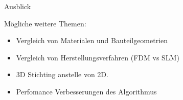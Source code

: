 \documentclass[../slides.tex]{subfiles}
\begin{document}
  \begin{frame}{Ausblick}
    \begin{minipage}[h]{.6\textwidth}
        \begin{block}{Mögliche weitere Themen:}
            \begin{itemize}
                \item Vergleich von Materialen und Bauteilgeometrien
                \item Vergleich von Herstellungsverfahren (FDM vs SLM)
                \item 3D Stichting anstelle von 2D.
                \item Perfomance Verbesserungen des Algorithmus
            \end{itemize}
        \end{block}
    \end{minipage}
    \hfill
    \begin{minipage}[h]{.39\textwidth}       
    \end{minipage}
  \end{frame}
\end{document}
